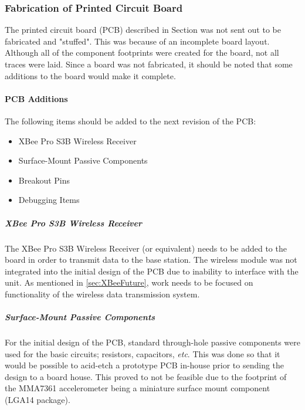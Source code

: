 \subsubsection{Fabrication of Printed Circuit Board}
The printed circuit board (PCB) described in Section \label{sec:PCB} was not sent out to be fabricated and "stuffed".
This was because of an incomplete board layout.
Although all of the component footprints were created for the board, not all traces were laid.
Since a board was not fabricated, it should be noted that some additions to the board would make it complete.

\paragraph{PCB Additions}
The following items should be added to the next revision of the PCB:
\begin{itemize}
\item XBee Pro S3B Wireless Receiver
\item Surface-Mount Passive Components
\item Breakout Pins
\item Debugging Items
\end{itemize}

\subparagraph{XBee Pro S3B Wireless Receiver}
The XBee Pro S3B Wireless Receiver (or equivalent) needs to be added to the board in order to transmit data to the base station. 
The wireless module was not integrated into the initial design of the PCB due to inability to interface with the unit.
As mentioned in \ref{sec:XBeeFuture}, work needs to be focused on functionality of the wireless data transmission system.
\subparagraph{Surface-Mount Passive Components}
For the initial design of the PCB, standard through-hole passive components were used for the basic circuits; resistors, capacitors, \textit{etc}.
This was done so that it would be possible to acid-etch a prototype PCB in-house prior to sending the design to a board house.
This proved to not be feasible due to the footprint of the MMA7361 accelerometer being a miniature surface mount component (LGA14 package).
